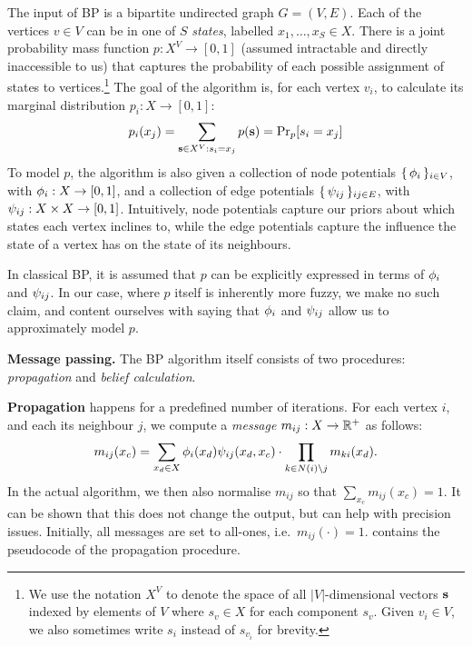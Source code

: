 \documentclass[final,letterpaper]{article}
\newcommand{\mypar}[1]{{\bf #1.}}
\newcommand{\myparcont}[1]{{\bf #1}}
\begin{document}
The input of BP is a bipartite undirected graph $G = (V, E)$. Each of the
vertices $v\in V$ can be in one of $S$ \emph{states}, labelled $x_1, \ldots,
x_S \in X$. There is a joint probability mass function $p: X^V \to [0, 1]$
(assumed intractable and directly inaccessible to us) that captures the probability of
each possible assignment of states to vertices.\footnote{We use the notation
$X^V$ to denote the space of all $|V|$-dimensional vectors $\ves$ indexed by
elements of $V$ where $s_v\in X$ for each component $s_v$. Given $v_i \in V$, we
also sometimes write $s_i$ instead of $s_{v_i}$ for brevity.} The goal of the
algorithm is, for each vertex $v_i$, to calculate its marginal distribution
$p_i: X \to [0, 1]$:
%
$$p_i(x_j) = \sum_{\ves \in X^V: s_i = x_j} p(\ves) = \Pr_p[s_i = x_j]$$
%
To model $p$, the algorithm is also given a collection of node potentials
$\{\,\phi_i\,\}_{i \in V}$, with $\phi_i: X \to [0, 1]$, and a collection of edge
potentials $\{\,\psi_{ij}\,\}_{ij \in E}$, with $\psi_{ij}: X\times X \to [0, 1]$.
Intuitively, node potentials capture our priors about which states each vertex
inclines to, while the edge potentials capture the influence the state of a
vertex has on the state of its neighbours.

In classical BP, it is assumed that $p$ can be explicitly expressed in terms of
$\phi_i$ and $\psi_{ij}$. In our case, where $p$ itself is inherently more
fuzzy, we make no such claim, and content ourselves with saying that $\phi_i$
and $\psi_{ij}$ allow us to approximately model $p$.

\mypar{Message passing} The BP algorithm itself consists of two
procedures: \emph{propagation} and \emph{belief calculation}.

\myparcont{Propagation} happens for a predefined number of iterations. For each vertex $i$, and each its neighbour $j$, we compute a \emph{message} $m_{ij} : X \to \mathbb{R}^+$ as follows:
%
$$m_{ij}(x_c) = \sum_{x_d \in X} \phi_i(x_d)\psi_{ij}(x_d, x_c) \cdot \prod_{k \in N(i) \setminus j} m_{ki}(x_d).$$
%
In the actual algorithm, we then also normalise $m_{ij}$ so that $\sum_{x_c}
m_{ij}(x_c) = 1$. It can be shown that this does not change the output, but can
help with precision issues. Initially, all messages are set to all-ones,
i.e.~$m_{ij}(\cdot) = 1$.
%
 contains the pseudocode of the propagation procedure.
\end{document}

